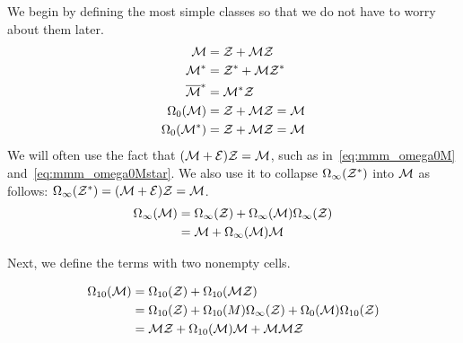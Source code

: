 \documentclass[12pt, a4paper, twoside]{report}
\begin{document}
We begin by defining the most simple classes so that we do not have to worry about them later. 
\begin{align}
  \mathcal{M} &= \mathcal{Z} + \mathcal{M}\mathcal{Z} \label{eq:mmm_m}\\
  \mathcal{M}^* &=  \mathcal{Z}^* + \mathcal{M}\mathcal{Z}^*\\
  \overline{\mathcal{M}}^* &= \mathcal{M}^*\mathcal{Z} \label{eq:mmm_barMstar}\\
  \Omega_0(\mathcal{M})&= \mathcal{Z} + \mathcal{M}\mathcal{Z} = \mathcal{M}\label{eq:mmm_omega0M}\\
  \Omega_0(\mathcal{M}^*) &= \mathcal{Z} + \mathcal{M}\mathcal{Z} = \mathcal{M}\label{eq:mmm_omega0Mstar}
\end{align}
We will often use the fact that $(\mathcal{M}+\mathcal{E})\mathcal{Z} = \mathcal{M}$, such as in~\eqref{eq:mmm_omega0M} and~\eqref{eq:mmm_omega0Mstar}. We also use it to collapse $\Omega_\infty(\mathcal{Z}^*)$ into $\mathcal{M}$ as follows: $\Omega_\infty(\mathcal{Z}^*) = (\mathcal{M}+\mathcal{E})\mathcal{Z} = \mathcal{M}$.
\begin{align}
  \begin{aligned}
    \Omega_\infty(\mathcal{M}) &= \Omega_\infty(\mathcal{Z}) + \Omega_\infty(\mathcal{M})\Omega_\infty(\mathcal{Z})\\
    &= \mathcal{M} + \Omega_\infty(\mathcal{M})\mathcal{M}
  \end{aligned}
      \label{eq:mmm_omegainfty}
\end{align}

Next, we define the terms with two nonempty cells.

\begin{align}
  \begin{aligned}
    \Omega_{10}(\mathcal{M}) &= \Omega_{10}(\mathcal{Z}) + \Omega_{10}(\mathcal{M}\mathcal{Z})\\
    &= \Omega_{10}(\mathcal{Z}) + \Omega_{10}(M)\Omega_\infty(\mathcal{Z}) + \Omega_0(\mathcal{M})\Omega_{10}(\mathcal{Z})\\
    &= \mathcal{M}\mathcal{Z} + \Omega_{10}(\mathcal{M})\mathcal{M} + \mathcal{M}\mathcal{M}\mathcal{Z}
  \end{aligned}
      \label{eq:mmm_omega10M}
\end{align}
\end{document}
